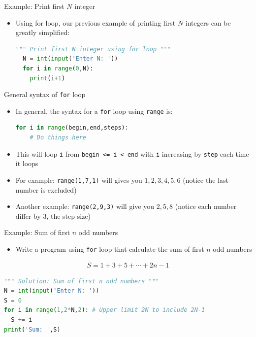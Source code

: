 \documentclass[10pt,xcolor={table,dvipsnames},t]{beamer}
\begin{document}
\begin{frame}[fragile]{Example: Print first $N$ integer}
  \begin{itemize}
    \item Using for loop, our previous example of printing first $N$ integers can be greatly simplified:
\begin{lstlisting}[language=python]
  """ Print first N integer using for loop """
  N = int(input('Enter N: '))
  for i in range(0,N):
    print(i+1)
\end{lstlisting}
  \end{itemize}
\end{frame}

\begin{frame}[fragile]{General syntax of \texttt{for} loop}
  \begin{itemize}
    \item In general, the syntax for a \texttt{for} loop using \texttt{range} is:
\begin{lstlisting}[language=python]
  for i in range(begin,end,steps):
    # Do things here
\end{lstlisting}
    \item This will loop \texttt{i} from \texttt{begin <= i < end} with \texttt{i} increasing by \texttt{step} each time it loops
    \item For example: \texttt{range(1,7,1)} will gives you ${1,2,3,4,5,6}$ (notice the last number is excluded)
    \item Another example: \texttt{range(2,9,3)} will give you $2,5,8$ (notice each number differ by 3, the step size)
  \end{itemize}
  
\end{frame}

\begin{frame}[fragile]{Example: Sum of first $n$ odd numbers}
  \begin{itemize}
    \item Write a program using \texttt{for} loop that calculate the sum of first $n$ odd numbers
  \end{itemize}
  \begin{align*}
    S = 1 + 3 + 5 + \cdots + 2n-1
  \end{align*}
\begin{lstlisting}[language=python]
""" Solution: Sum of first n odd numbers """
N = int(input('Enter N: '))
S = 0
for i in range(1,2*N,2): # Upper limit 2N to include 2N-1
  S += i
print('Sum: ',S)
\end{lstlisting}
\end{frame}
\end{document}
